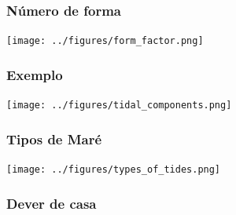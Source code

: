 \begin{frame}
  \frametitle{Número de forma}
  \begin{center}
    \texttt{[image: ../figures/form\_factor.png]}
  \end{center}
\end{frame}


\begin{frame}
  \frametitle{Exemplo}
  \begin{center}
    \texttt{[image: ../figures/tidal\_components.png]}
  \end{center}
\end{frame}


\begin{frame}
  \frametitle{Tipos de Maré}
  \begin{center}
    \texttt{[image: ../figures/types\_of\_tides.png]}
  \end{center}
\end{frame}


\begin{frame}
\frametitle{Dever de casa}
\end{frame}


